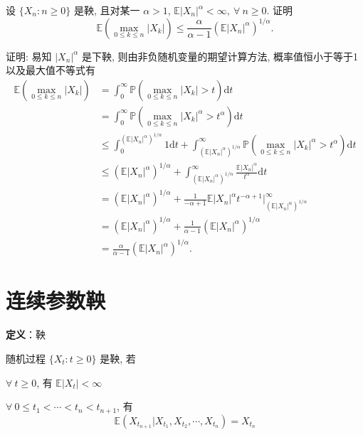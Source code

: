 \documentclass[openany]{ctexbook}
\theoremstyle{kaiti}
\theoremstyle{normal}
\begin{document}
设 $\{X_n:n\geqslant0\}$ 是鞅, 且对某一 $\alpha>1$, $\mathbb{E}|X_n|^\alpha<\infty,~\forall~n\geqslant0$. 证明
\begin{equation}
  \mathbb{E}\left(\max_{0\leqslant k\leqslant n}|X_k|\right)\leqslant\frac{\alpha}{\alpha-1}(\mathbb{E}|X_n|^\alpha)^{1/\alpha}.
\end{equation}

证明: 易知 $|X_n|^\alpha$ 是下鞅, 则由非负随机变量的期望计算方法, 概率值恒小于等于1以及最大值不等式有
\begin{equation}
  \begin{aligned}
    \mathbb{E}\left(\max_{0\leqslant k\leqslant n}|X_k|\right)
    &=\int_0^\infty \mathbb{P}\left(\max_{0\leqslant k\leqslant n}|X_k|>t\right)\mathrm{d}t\\
    &=\int_0^\infty \mathbb{P}\left(\max_{0\leqslant k\leqslant n}|X_k|^\alpha>t^\alpha\right)\mathrm{d}t\\
    &\leqslant\int_0^{(\mathbb{E}|X_n|^\alpha)^{1/\alpha}}1\mathrm{d}t+\int_{(\mathbb{E}|X_n|^\alpha)^{1/\alpha}}^\infty \mathbb{P}\left(\max_{0\leqslant k\leqslant n}|X_k|^\alpha>t^\alpha\right)\mathrm{d}t\\
    &\leqslant(\mathbb{E}|X_n|^\alpha)^{1/\alpha}+\int_{(\mathbb{E}|X_n|^\alpha)^{1/\alpha}}^\infty\frac{\mathbb{E}|X_n|^\alpha}{t^\alpha}\mathrm{d}t\\
    &=(\mathbb{E}|X_n|^\alpha)^{1/\alpha}+\frac{1}{-\alpha+1}\mathbb{E}|X_n|^\alpha t^{-\alpha+1}\Big|_{(\mathbb{E}|X_n|^\alpha)^{1/\alpha}}^\infty\\
    &=(\mathbb{E}|X_n|^\alpha)^{1/\alpha}+\frac{1}{\alpha-1}(\mathbb{E}|X_n|^\alpha)^{1/\alpha}\\
    &=\frac{\alpha}{\alpha-1}(\mathbb{E}|X_n|^\alpha)^{1/\alpha}.
  \end{aligned}
\end{equation}

\section{连续参数鞅}

\textbf{定义}：鞅

随机过程 $\{X_t:t\geqslant0\}$ 是鞅, 若 

$\forall~t\geqslant0$, 有 $\mathbb{E}|X_t|<\infty$

$\forall~0\leqslant  t_1<\cdots< t_n< t_{n+1}$, 有
\begin{equation}
  \mathbb{E}(X_{t_{n+1}}|X_{t_1},X_{t_2},\cdots,X_{t_n})=X_{t_n}
\end{equation}
\end{document}
